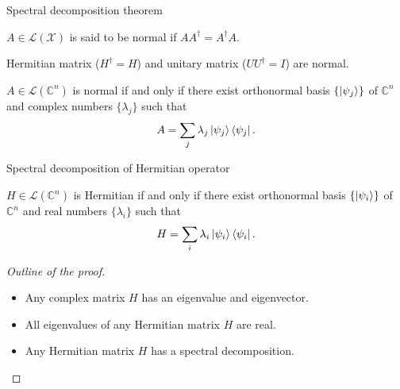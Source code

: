 \documentclass[10pt]{beamer}
\newcommand\emm[1]{\textcolor{redorange}{{#1}}}
\begin{document}
\begin{frame}{Spectral decomposition theorem}
\begin{definition}
$A\in\mathcal{L}(\mathcal{X})$ is said to be \emm{normal} if $AA^\dagger = A^\dagger A$.
\end{definition}

\vspace{1em}
Hermitian matrix ($H^\dagger = H$) and unitary matrix ($UU^\dagger = I$) are normal.

\vspace{2em}
\begin{theorem}
$A\in \mathcal{L}(\mathbb{C}^n)$ is \emm{normal} if and only if there exist orthonormal basis $\{\ket{\psi_j}\}$ of $\mathbb{C}^n$ and complex numbers $\{\lambda_j\}$ such that
\begin{equation*}
A=\sum_j \lambda_j\ket{\psi_j}\bra{\psi_j}.
\end{equation*}
\end{theorem}
\end{frame}

\begin{frame}{Spectral decomposition of Hermitian operator}
\begin{theorem}
$H\in \mathcal{L}(\mathbb{C}^n)$ is \emm{Hermitian} if and only if there exist orthonormal basis $\{\ket{\psi_i}\}$ of $\mathbb{C}^n$ and real numbers $\{\lambda_i\}$ such that
\begin{equation*}
H=\sum_i \lambda_i\ket{\psi_i}\bra{\psi_i}.
\end{equation*}
\end{theorem}
\begin{proof}[Outline of the proof]
\begin{itemize}
\item Any complex matrix $H$ has an eigenvalue and eigenvector.
\item All eigenvalues of any Hermitian matrix $H$ are real.
\item Any Hermitian matrix $H$ has a spectral decomposition.
\end{itemize}
\end{proof}
\end{frame}
\fi
\end{document}

